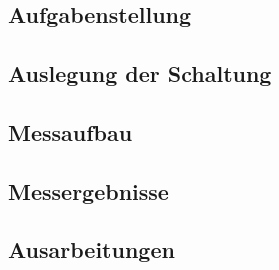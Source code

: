 	\section{}
		\subsection{Aufgabenstellung}

		\subsection{Auslegung der Schaltung}

		\subsection{Messaufbau}

		\subsection{Messergebnisse}

		\subsection{Ausarbeitungen}
		
